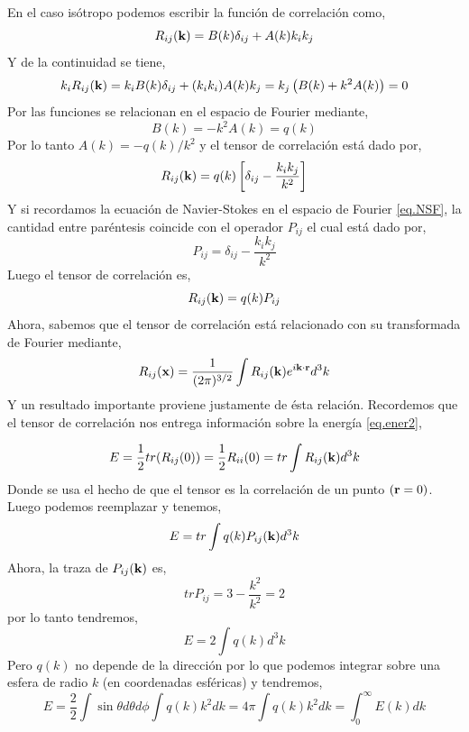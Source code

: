 \documentclass[executivepaper,12pt]{article}
\numberwithin{equation}{section}
\begin{document}
En el caso isótropo podemos escribir la función de correlación como,
\begin{equation*}
	R_{ij}(\vb{k})=B(k)\delta_{ij}+A(k)k_i k_j
\end{equation*}
Y de la continuidad se tiene,
\begin{equation*}
	k_iR_{ij}(\vb{k})=k_iB(k)\delta_{ij}+(k_ik_i)A(k)k_j=k_j\left( B(k)+k^2A(k) \right)=0
\end{equation*}
Por las funciones se relacionan en el espacio de Fourier mediante,
\begin{equation*}
	B(k)=-k^2A(k)=q(k)
\end{equation*}
Por lo tanto $A(k)=-q(k)/k^2$ y el tensor de correlación está dado por,
\begin{equation*}
	R_{ij}(\vb{k})=q(k)\left[\delta_{ij}-\frac{k_i k_j}{k^2}\right]
\end{equation*} 
Y si recordamos la ecuación de Navier-Stokes en el espacio de Fourier \ref{eq.NSF}, la cantidad entre paréntesis coincide con el operador $P_{ij}$ el cual está dado por,
\begin{equation*}
	P_{ij}=\delta_{ij}-\frac{k_i k_j}{k^2}
\end{equation*}
Luego el tensor de correlación es,
\begin{equation*}
		R_{ij}(\vb{k})=q(k)P_{ij}
\end{equation*}
Ahora, sabemos que el tensor de correlación está relacionado con su transformada de Fourier mediante,
\begin{equation*}
	R_{ij}(\vb{x})=\frac{1}{(2\pi)^{3/2}}\int R_{ij}(\vb{k})e^{i\vb{k}\cdot{\vb{r}}} d^3k
\end{equation*}
Y un resultado importante proviene justamente de ésta relación. Recordemos que el tensor de correlación nos entrega información sobre la energía \ref{eq.ener2},

\begin{equation*}
	E=\frac{1}{2}tr(R_{ij}(0))=\frac{1}{2}R_{ii}(0)=tr\int R_{ij}(\vb{k}) d^3k
\end{equation*} 
Donde se usa el hecho de que el tensor es la correlación de un punto $(\vb{r}=0)$. Luego podemos reemplazar y tenemos,
\begin{equation*}
	E=tr\int q(k)P_{ij}(\vb{k}) d^3k
\end{equation*}
Ahora, la traza de $P_{ij}(\vb{k})$ es,
\begin{equation*}
	tr P_{ij}=3-\frac{k^2}{k^2}=2
\end{equation*}
por lo tanto tendremos,
\begin{equation*}
	E=2\int q(k)d^3k
\end{equation*}
Pero $q(k)$ no depende de la dirección por lo que podemos integrar sobre una esfera de radio $k$ (en coordenadas esféricas) y tendremos, 
\begin{equation*}
	E=\frac{2}{2}\int \sin\theta d\theta d\phi \int q(k) k^2 dk=4\pi\int q(k) k^2 dk=\int_0^{\infty} E(k) dk
\end{equation*}
\end{document}
